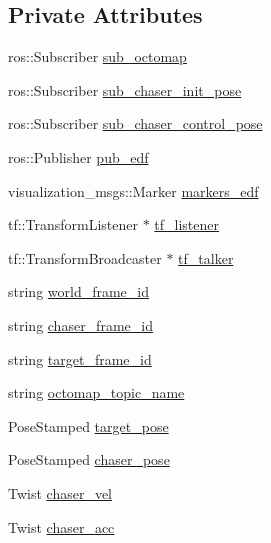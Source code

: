 \subsection*{Private Attributes}
\begin{DoxyCompactItemize}
\item 
ros\+::\+Subscriber \hyperlink{class_objects_handler_a3b384ae3f8f66557b1c1ac04523fb330}{sub\+\_\+octomap}
\item 
ros\+::\+Subscriber \hyperlink{class_objects_handler_a9a2e098b85260b71c88b81dadd6ca58a}{sub\+\_\+chaser\+\_\+init\+\_\+pose}
\item 
ros\+::\+Subscriber \hyperlink{class_objects_handler_adc3a2895e97bb2349fb5cb71d4eec191}{sub\+\_\+chaser\+\_\+control\+\_\+pose}
\item 
ros\+::\+Publisher \hyperlink{class_objects_handler_a86a1f98983b533f77bf17867affb5251}{pub\+\_\+edf}
\item 
visualization\+\_\+msgs\+::\+Marker \hyperlink{class_objects_handler_ad6904dcaaad790234569760df0fb0ac2}{markers\+\_\+edf}
\item 
tf\+::\+Transform\+Listener $\ast$ \hyperlink{class_objects_handler_aea45bba31aa769008386100725bda66b}{tf\+\_\+listener}
\item 
tf\+::\+Transform\+Broadcaster $\ast$ \hyperlink{class_objects_handler_af49de4eabb124e2ee6c9e12ebb31bca3}{tf\+\_\+talker}
\item 
string \hyperlink{class_objects_handler_a1c0586ae7467bb8a3df8ad247ac7b10b}{world\+\_\+frame\+\_\+id}
\item 
string \hyperlink{class_objects_handler_a3e8d08bf5d76d69f1768b53fd799953c}{chaser\+\_\+frame\+\_\+id}
\item 
string \hyperlink{class_objects_handler_a7a616768386c4c7da9af4da3d07bd936}{target\+\_\+frame\+\_\+id}
\item 
string \hyperlink{class_objects_handler_a70b5e252a180d919653c7b53aff6f534}{octomap\+\_\+topic\+\_\+name}
\item 
Pose\+Stamped \hyperlink{class_objects_handler_ad436bfd8b262f473f0e4ca92b3c3402b}{target\+\_\+pose}
\item 
Pose\+Stamped \hyperlink{class_objects_handler_a79fd5f872a40cca5ea599f1e83dcb3ad}{chaser\+\_\+pose}
\item 
Twist \hyperlink{class_objects_handler_a74e3f3b4bf263711c389190a595368e2}{chaser\+\_\+vel}
\item 
Twist \hyperlink{class_objects_handler_a36db60068ada56b9142b3d6ef0437749}{chaser\+\_\+acc}
\item 

\end{DoxyCompactItemize}
